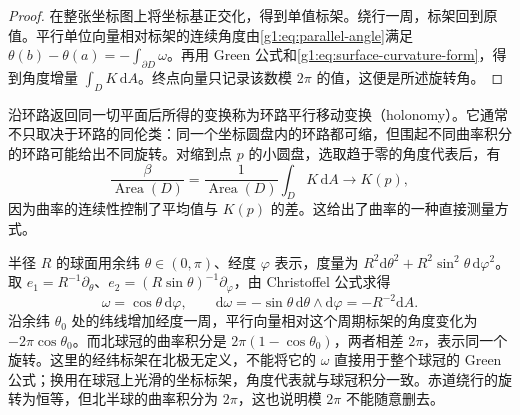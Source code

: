 \begin{proof}
	在整张坐标图上将坐标基正交化，得到单值标架。绕行一周，标架回到原值。平行单位向量相对标架的连续角度由\eqref{g1:eq:parallel-angle}满足 \(\theta(b)-\theta(a)=-\int_{\partial D}\omega\)。再用 Green 公式和\eqref{g1:eq:surface-curvature-form}，得到角度增量 \(\int_DK\,\mathrm{d}A\)。终点向量只记录该数模 \(2\pi\) 的值，这便是所述旋转角。
\end{proof}

沿环路返回同一切平面后所得的变换称为环路平行移动变换（holonomy）。它通常不只取决于环路的同伦类：同一个坐标圆盘内的环路都可缩，但围起不同曲率积分的环路可能给出不同旋转。对缩到点 \(p\) 的小圆盘，选取趋于零的角度代表后，有
\[
	\frac{\beta}{\operatorname{Area}(D)}
	=\frac{1}{\operatorname{Area}(D)}\int_DK\,\mathrm{d}A\longrightarrow K(p),
\]
因为曲率的连续性控制了平均值与 \(K(p)\) 的差。这给出了曲率的一种直接测量方式。

\begin{example}
	\label{g1:exm:spherical-latitude-holonomy}
	半径 \(R\) 的球面用余纬 \(\theta\in(0,\pi)\)、经度 \(\varphi\) 表示，度量为 \(R^2\mathrm{d}\theta^2+R^2\sin^2\theta\,\mathrm{d}\varphi^2\)。取 \(e_1=R^{-1}\partial_\theta\)、\(e_2=(R\sin\theta)^{-1}\partial_\varphi\)，由 Christoffel 公式求得
	\[
		\omega=\cos\theta\,\mathrm{d}\varphi,\qquad
		\mathrm{d}\omega=-\sin\theta\,\mathrm{d}\theta\wedge\mathrm{d}\varphi=-R^{-2}\mathrm{d}A.
	\]
	沿余纬 \(\theta_0\) 处的纬线增加经度一周，平行向量相对这个周期标架的角度变化为 \(-2\pi\cos\theta_0\)。而北球冠的曲率积分是 \(2\pi(1-\cos\theta_0)\)，两者相差 \(2\pi\)，表示同一个旋转。这里的经纬标架在北极无定义，不能将它的 \(\omega\) 直接用于整个球冠的 Green 公式；换用在球冠上光滑的坐标标架，角度代表就与球冠积分一致。赤道绕行的旋转为恒等，但北半球的曲率积分为 \(2\pi\)，这也说明模 \(2\pi\) 不能随意删去。
\end{example}
